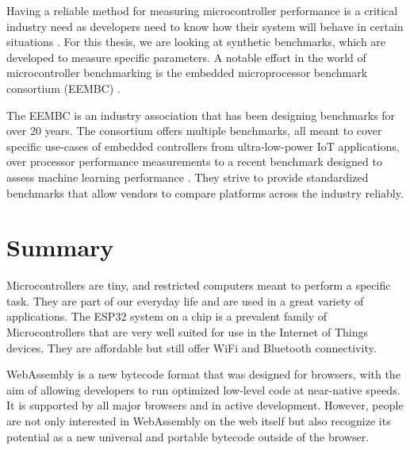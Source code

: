 Having a reliable method for measuring microcontroller performance is a critical industry need \autocite{knox_atmel_2013-1} as developers need to know how their system will behave in certain situations \autocite{kramer_benchmarks_2009-1}. For this thesis, we are looking at synthetic benchmarks, which are developed to measure specific parameters. A notable effort in the world of microcontroller benchmarking is the embedded microprocessor benchmark consortium (EEMBC) \autocite{noauthor_embedded_nodate}.

The EEMBC is an industry association that has been designing benchmarks for over 20 years. The consortium offers multiple benchmarks, all meant to cover specific use-cases of embedded controllers from ultra-low-power IoT applications, over processor performance measurements to a recent benchmark designed to assess machine learning performance \autocite{noauthor_benchmark_nodate}. They strive to provide standardized benchmarks that allow vendors to compare platforms across the industry reliably.

\section{Summary}
Microcontrollers are tiny, and restricted computers meant to perform a specific task. They are part of our everyday life and are used in a great variety of applications. The ESP32 system on a chip is a prevalent family of Microcontrollers that are very well suited for use in the Internet of Things devices. They are affordable but still offer WiFi and Bluetooth connectivity.

WebAssembly is a new bytecode format that was designed for browsers, with the aim of allowing developers to run optimized low-level code at near-native speeds. It is supported by all major browsers and in active development. However, people are not only interested in WebAssembly on the web itself but also recognize its potential as a new universal and portable bytecode outside of the browser.